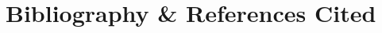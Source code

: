 \documentclass[11pt,notitlepage]{article}
\begin{document}




%




%



\newpage



\newpage

\section*{Bibliography \& References Cited}

\nocite{*}





\newpage




\newpage




\end{document}
